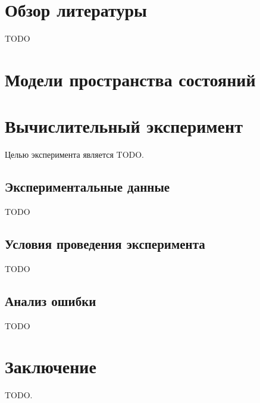 \documentclass[a4paper, 12pt]{article}
\begin{document}
\section{Обзор литературы}
TODO

\section{Модели пространства состояний}

\section{Вычислительный эксперимент}
Целью эксперимента является TODO.

\subsection{Экспериментальные данные}
TODO

\subsection{Условия проведения эксперимента}
TODO

\subsection{Анализ ошибки}
TODO


\section{Заключение}
TODO.



\end{document}
